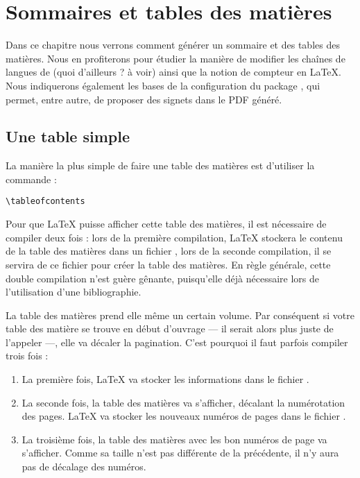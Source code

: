 \chapter{Sommaires et tables des matières}\label{toc}

\begin{prealable}
Dans ce chapitre nous verrons comment générer un sommaire et des tables des matières. Nous en profiterons pour étudier la manière de modifier les chaînes de langues de (quoi d'ailleurs ? à voir) ainsi que la notion de compteur en \LaTeX{}. Nous indiquerons également les bases de la configuration du package , qui permet, entre autre, de proposer des signets dans le PDF généré.
\end{prealable}

\section{Une table simple}

La manière la plus simple de faire une table des matières est d'utiliser la commande :

\begin{verbatim}
\tableofcontents
\end{verbatim}

Pour que \LaTeX{} puisse afficher cette table des matières, il est nécessaire de compiler deux fois : lors de la première compilation, \LaTeX{} stockera le contenu de la table des matières dans un fichier , lors de la seconde compilation, il se servira de ce fichier pour créer la table des matières. En règle générale, cette double compilation n'est guère gênante, puisqu'elle déjà nécessaire lors de l'utilisation d'une bibliographie.

\begin{attention}
La table des matières prend elle même un certain volume. Par conséquent si votre table des matière se trouve en début d'ouvrage --- il serait alors plus juste de l'appeler  ---, elle va décaler la pagination. C'est pourquoi il faut parfois compiler trois fois :

\begin{enumerate}
\item La première fois, \LaTeX{} va stocker les informations dans le fichier .
\item La seconde fois, la table des matières va s'afficher, décalant la numérotation des pages. \LaTeX{} va stocker les nouveaux numéros de pages  dans le fichier .
\item La troisième fois, la table des matières avec les bon numéros de page  va s'afficher. Comme sa taille n'est pas différente de la précédente, il n'y aura pas de décalage des numéros.
\end{enumerate}

\end{attention}

